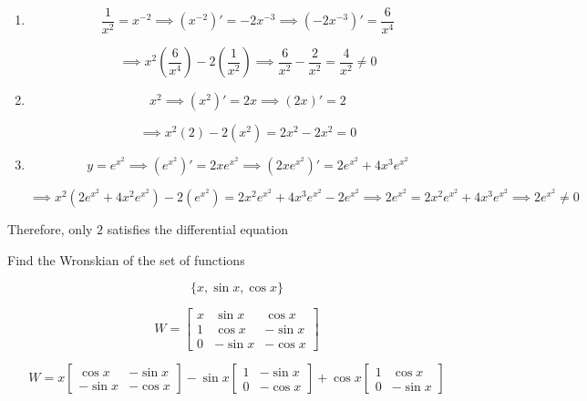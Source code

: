 \documentclass{report}
\begin{document}
\begin{enumerate}
	\item
	
	$$
	\frac{1}{x^2} = x^{-2} \implies (x^{-2})' = -2x^{-3} \implies (-2x^{-3})' = \frac{6}{x^4}
	$$
	
	$$
	\implies x^2 \left(\frac{6}{x^4} \right) - 2 \left( \frac{1}{x^2} \right) \implies \frac{6}{x^2} - \frac{2}{x^2} = \frac{4}{x^2} \ne 0 
	$$
	
	\item 
	
	$$
	x^2 \implies (x^2)' = 2x \implies (2x)' = 2
	$$
	
	$$
	\implies x^2(2) - 2(x^2) = 2x^2 - 2x^2 = 0
	$$
	
	\item 
	
	$$
	y = e^{x^2} \implies \left( e^{x^2} \right)' = 2xe^{x^2} \implies \left( 2xe^{x^2} \right)' = 2e^{x^2} + 4x^3 e^{x^2}
	$$
	
	$$
	\implies x^2 (2e^{x^2} + 4x^2 e^{x^2}) - 2 \left( e^{x^2} \right) = 2x^2 e^{x^2} + 4x^3e^{x^2} - 2e^{x^2} \implies 2e^{x^2} = 2x^2{e^{x^2}} + 4x^3 e^{x^2} \implies 2e^{x^2} \ne 0 
	$$

\end{enumerate}

Therefore, only $2$ satisfies the differential equation

\begin{tcolorbox}[colframe = lightred]
	Find the Wronskian of the set of functions 
	
	$$
	\{ x, \sin{x}, \cos{x} \}
	$$
\end{tcolorbox}

$$
W = \begin{bmatrix} x & \sin{x} & \cos{x} \\ 1 & \cos{x} & -\sin{x} \\ 0 & -\sin{x} & - \cos{x} \end{bmatrix}
$$

$$
W= x \begin{bmatrix} \cos{x} & -\sin{x} \\ -\sin{x} & -\cos{x} \end{bmatrix} - \sin{x} \begin{bmatrix} 1 & -\sin{x} \\ 0 & -\cos{x} \end{bmatrix} + \cos{x} \begin{bmatrix} 1 & \cos{x} \\ 0 & -\sin{x} \end{bmatrix}
$$
\end{document}
